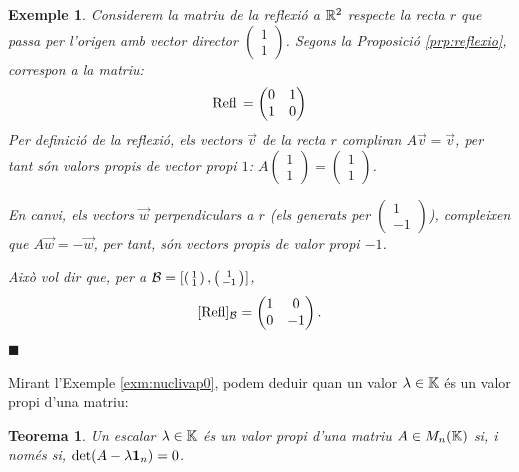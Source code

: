 \documentclass[
  11pt,
]{book}
\numberwithin{dummy}{section}
\theoremstyle{maincolornumbox}
\newtheorem{theorem}{TTTT}[chapter]
\newtheorem{theoremeT}{Teorema}[chapter]
\theoremstyle{blacknumex}
\newtheorem{exampleT}{Exemple}[chapter]
\theoremstyle{blacknumbox}
\theoremstyle{maincolornum}
\renewenvironment{theorem}{\begin{tBox}\begin{theoremeT}}{\end{theoremeT}\end{tBox}}
\newenvironment{example}{\begin{exampleT}}{\hfill{\tiny\ensuremath{\blacksquare}}\end{exampleT}}
\newlength\esp
\begin{document}
\begin{example}
Considerem la matriu de la reflexió a \(\mathbb{R}^2\) respecte la recta \(r\) que
passa per l'origen amb vector director
\(\left(\begin{smallmatrix}1\\1\end{smallmatrix}\right)\). Segons la
Proposició \ref{prp:reflexio}, correspon a la matriu:
\[\operatorname{Refl}{}=\begin{pmatrix}
0 & 1 \\ 1 & 0
\end{pmatrix}\] Per definició de la reflexió, els vectors \(\vec v\) de la
recta \(r\) compliran \(A\vec v=\vec v\), per tant són valors propis de
vector propi \(1\):
\(A\left(\begin{smallmatrix}1\\1\end{smallmatrix}\right)=\left(\begin{smallmatrix}1\\1\end{smallmatrix}\right)\).

En canvi, els vectors \(\vec w\) perpendiculars a \(r\) (els generats per
\(\left(\begin{smallmatrix}1\\-1\end{smallmatrix}\right)\)), compleixen
que \(A\vec w=-\vec w\), per tant, són vectors propis de valor propi \(-1\).

Això vol dir que, per a
\(\mathcal{B}=[\left(\begin{smallmatrix}1\\1\end{smallmatrix}\right),\left(\begin{smallmatrix}1\\-1\end{smallmatrix}\right)]\),
\[[\operatorname{Refl}]_{\mathcal{B}}=\begin{pmatrix}
1 & 0 \\ 0 & -1
\end{pmatrix}.\]
\end{example}

Mirant l'Exemple
\ref{exm:nuclivap0}, podem deduir quan un valor \(\lambda\in\mathbb{K}\)
és un valor propi d'una matriu:

\begin{theorem}
\protect\hypertarget{thm:vapsA}{}\label{thm:vapsA}Un escalar \(\lambda\in \mathbb{K}\) és un valor
propi d'una matriu \(A\in M_n(\mathbb{K})\) si, i només si,
\(\det(A-\lambda\mathbf{1}_n)=0\).
\end{theorem}
\end{document}
